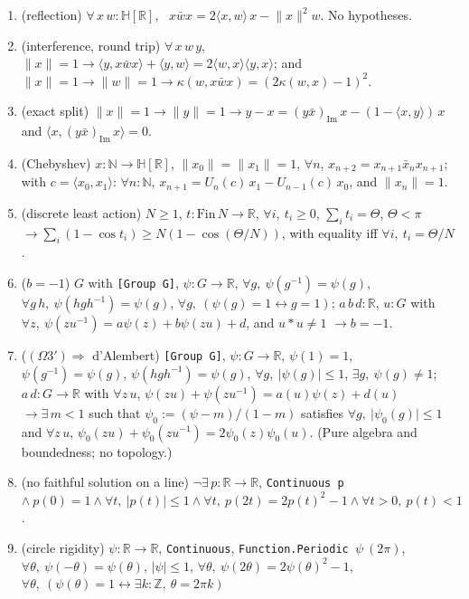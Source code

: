 \documentclass[11pt,reqno]{amsart}
\theoremstyle{definition}
\theoremstyle{remark}
\numberwithin{equation}{section}
\newcommand{\R}{\mathbb{R}}
\newcommand{\HH}{\mathbb{H}}
\newcommand{\Z}{\mathbb{Z}}
\newcommand{\im}{\operatorname{Im}}
\newcommand{\ip}[2]{\langle #1,#2\rangle}
\begin{document}
\begin{enumerate}[label=\textbf{F\arabic*.},leftmargin=2.4em]\small
\item (reflection) $\forall\,x\,w:\HH[\R]$, \ $x\bar wx=2\ip xw\,x-\lVert x\rVert^2w$.  No hypotheses.
\item (interference, round trip) $\forall\,x\,w\,y$, $\lVert x\rVert=1\to\ip y{x\bar wx}+\ip yw=2\ip wx\ip yx$; and
$\lVert x\rVert=1\to\lVert w\rVert=1\to\kappa(w,x\bar wx)=(2\kappa(w,x)-1)^2$.
\item (exact split) $\lVert x\rVert=1\to\lVert y\rVert=1\to y-x=(y\bar x)_{\im}\,x-(1-\ip xy)\,x$ and
$\ip x{(y\bar x)_{\im}\,x}=0$.
\item (Chebyshev) $x:\mathbb N\to\HH[\R]$, $\lVert x_0\rVert=\lVert x_1\rVert=1$, $\forall n$, $x_{n+2}=x_{n+1}\bar x_nx_{n+1}$; with
$c=\ip{x_0}{x_1}$: $\forall n:\mathbb N$, $x_{n+1}=U_n(c)\,x_1-U_{n-1}(c)\,x_0$, and $\lVert x_n\rVert=1$.
\item (discrete least action) $N\ge1$, $t:\mathrm{Fin}\,N\to\R$, $\forall i,\ t_i\ge0$, $\sum_it_i=\Theta$, $\Theta<\pi$
$\to\sum_i(1-\cos t_i)\ge N(1-\cos(\Theta/N))$, with equality iff $\forall i,\ t_i=\Theta/N$.
\item ($b=-1$) $G$ with \texttt{[Group G]}, $\psi:G\to\R$, $\forall g,\ \psi(g^{-1})=\psi(g)$, $\forall g\,h,\ \psi(hgh^{-1})=\psi(g)$,
$\forall g,\ (\psi(g)=1\leftrightarrow g=1)$; $a\,b\,d:\R$, $u:G$ with $\forall z,\ \psi(zu^{-1})=a\psi(z)+b\psi(zu)+d$, and $u*u\ne1$
$\to b=-1$.
\item ($(\Omega3')\Rightarrow$ d'Alembert) \texttt{[Group G]}, $\psi:G\to\R$, $\psi(1)=1$, $\psi(g^{-1})=\psi(g)$, $\psi(hgh^{-1})=\psi(g)$,
$\forall g,\ \lvert\psi(g)\rvert\le1$, $\exists g,\ \psi(g)\ne1$; $a\,d:G\to\R$ with $\forall z\,u$,
$\psi(zu)+\psi(zu^{-1})=a(u)\psi(z)+d(u)$ $\to\exists\,m<1$ such that $\psi_0:=(\psi-m)/(1-m)$ satisfies
$\forall g,\ \lvert\psi_0(g)\rvert\le1$ and $\forall z\,u$, $\psi_0(zu)+\psi_0(zu^{-1})=2\psi_0(z)\psi_0(u)$.  (Pure algebra and
boundedness; no topology.)
\item (no faithful solution on a line) $\neg\exists\,p:\R\to\R$, \texttt{Continuous p} $\wedge\ p(0)=1\wedge\forall t,\ \lvert p(t)\rvert\le1
\wedge\forall t,\ p(2t)=2p(t)^2-1\wedge\forall t>0,\ p(t)<1$.
\item (circle rigidity) $\psi:\R\to\R$, \texttt{Continuous}, \texttt{Function.Periodic }$\psi\ (2\pi)$, $\forall\theta,\ \psi(-\theta)=\psi(\theta)$,
$\lvert\psi\rvert\le1$, $\forall\theta,\ \psi(2\theta)=2\psi(\theta)^2-1$, $\forall\theta,\ (\psi(\theta)=1\leftrightarrow\exists k:\Z,\ \theta=2\pi k)$

\end{enumerate}
\end{document}
